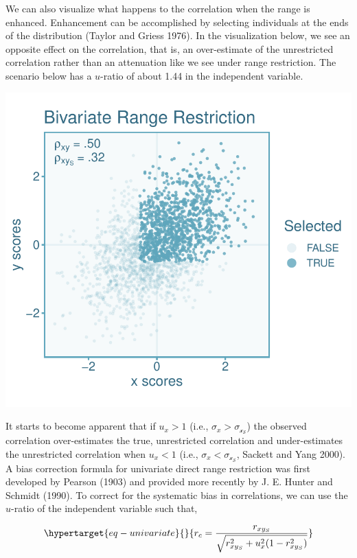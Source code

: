 \documentclass[
  letterpaper,
  DIV=11,
  numbers=noendperiod]{scrreprt}
\begin{document}
We can also visualize what happens to the correlation when the range is
enhanced. Enhancement can be accomplished by selecting individuals at
the ends of the distribution (Taylor and Griess 1976). In the
visualization below, we see an opposite effect on the correlation, that
is, an over-estimate of the unrestricted correlation rather than an
attenuation like we see under range restriction. The scenario below has
a \(u\)-ratio of about 1.44 in the independent variable.

\includegraphics{indirect_range_restriction_files/figure-pdf/unnamed-chunk-4-1.pdf}

It starts to become apparent that if \(u_x>1\) (i.e.,
\(\sigma_x>\sigma_\mathcal{x_S}\)) the observed correlation
over-estimates the true, unrestricted correlation and under-estimates
the unrestricted correlation when \(u_x<1\) (i.e.,
\(\sigma_x<\sigma_\mathcal{x_S}\), Sackett and Yang 2000). A bias
correction formula for univariate direct range restriction was first
developed by Pearson (1903) and provided more recently by J. E. Hunter
and Schmidt (1990). To correct for the systematic bias in correlations,
we can use the \(u\)-ratio of the independent variable such that,

\begin{equation}\protect\hypertarget{eq-univariate}{}{
r_c = \frac{r_{xy_S}}{\sqrt{r_{xy_S}^2 + u_{x}^2 (1- r_{xy_S}^2)  }}
}\label{eq-univariate}\end{equation}
\end{document}
